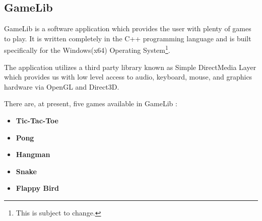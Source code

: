 \documentclass[12pt]{article}
\begin{document}
		\subsection{GameLib}
		\begin{flushleft}
			\setlength{\parindent}{10ex}
			GameLib is a software application which provides the user with plenty of games to play. It is written completely in the C++ programming language and is built specifically for the Windows(x64) Operating System\footnote{This is subject to change.}. \par
			The application utilizes a third party library known as Simple DirectMedia Layer which provides us with low level access to audio, keyboard, mouse, and graphics hardware via OpenGL and Direct3D. \par
			\noindent There are, at present, five games available in GameLib :
			\begin{itemize}
				\item {\bf Tic-Tac-Toe}
				\item {\bf Pong}
				\item {\bf Hangman}
				\item {\bf Snake}
				\item {\bf Flappy Bird}
			\end{itemize}
		\end{flushleft}
		
		\clearpage
		
\end{document}
